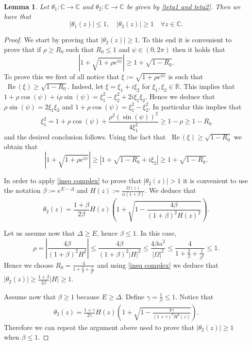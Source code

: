 \documentclass{article}
\numberwithin{equation}{section}
\renewcommand*{\Re}{\mathop{}\!\mathrm{Re}\,} %
\theoremstyle{plain}
\newtheorem{lemma}[theorem]{Lemma}
\begin{document}
\begin{lemma} \label{lem: theta_1 small teta_2 large}
    Let $\theta_1: \mathbb C \rightarrow \mathbb C $ and $\theta_2 : \mathbb C \rightarrow \mathbb C $ be given by \eqref{teta1 and teta2}. 
    Then we have that 
    \[
    |\theta_1(z) | \leq 1 , \quad |\theta_2 (z) | \geq 1 \quad \forall z \in \mathbb C. 
    \]
\end{lemma}
\begin{proof}
    We start by proving that $|\theta_2(z) |\geq 1$. 
    To this end it is convenient to prove that if $\rho \geq R_0$ such that $R_0 \leq 1$ and $\psi \in (0, 2 \pi)$ then it holds that
    \begin{equation} \label{ineq complex}
  |  1+ \sqrt{1+\rho e^{i \psi }} | \geq 1+ \sqrt{1- R_0}. 
    \end{equation}
    To prove this we first of all notice that $\xi:= \sqrt{1+\rho e^{i \psi }}$ is such that $\Re(\xi) \geq \sqrt{1- R_0}$. Indeed, let $\xi=\xi_1+ i \xi_2 $ for $\xi_1, \xi_2 \in \mathbb R$. This implies that $1+ \rho \cos (\psi) + i \rho \sin(\psi) =  \xi_1^2- \xi_2^2 + 2 i \xi_1 \xi_2 $. Hence we deduce that $ \rho\sin (\psi) =  2 \xi_1 \xi_2 $ and $1+ \rho \cos (\psi) = \xi_1^2- \xi_2^2$. In particular this implies that
    \[
    \xi^2_1= 1+\rho \cos(\psi) + \frac{\rho^2 (\sin(\psi))^2 }{4 \xi_1^2} \geq 1-\rho \geq 1-R_0
    \]
    and the desired conclusion follows. 
    Using the fact that $\Re(\xi) \geq \sqrt{1- R_0} $ we obtain that
    \[
     |  1+ \sqrt{1+\rho e^{i \psi }} | \geq   |  1+ \sqrt{1-R_0}+ i \xi_2 | \geq    1+ \sqrt{1-R_0} .
    \]
  
    In order to apply \eqref{ineq complex} to prove that $|\theta_2 (z)|>1$ it is convenient to use the notation $\beta:= e^{E- \Delta }$ and $H(z):= \frac{\Omega(z)}{\alpha (1+\beta)} $. We deduce that
    \[
    \theta_2(z)= \frac{1+\beta}{2 \beta} H(z)  \left( 1+ \sqrt{1- \frac{4 \beta}{(1+\beta )^2 H(z)^2}} \right).
    \]
    
    Let us assume now that $\Delta \geq E$, hence $\beta \leq 1 $. 
  In this case,
  \[ 
  \rho = \left|\frac{4 \beta}{(1+\beta )^2 H^2}\right| \leq  \frac{4 \beta}{(1+\beta )^2 \left|H\right|^2} \leq  \frac{4 \beta \alpha^2 }{ \left|\Omega\right|^2} \leq \frac{4 }{1+\frac{2}{\beta} +\frac{1}{\beta^2}} \leq 1.  
  \] 
  Hence we choose $R_0=  \frac{4 }{1+\frac{2}{\beta} +\frac{1}{\beta^2}}$ and using \eqref{ineq complex} we deduce that $|\theta_2 (z)| \geq \frac{1+ \beta }{ 2 \beta } |H| \geq  1 $. 

  Assume now that $\beta \geq 1 $ because $E \geq \Delta$. Define $\gamma = \frac{1}{\beta } \leq 1 $. Notice that 
    \begin{align*}  \theta_2(z)= \frac{1+\gamma}{2 \gamma} H(z) \left( 1+ \sqrt{1- \frac{4 \gamma}{(1+\gamma)^2 H^2(z)}} \right). 
  \end{align*}
  Therefore we can repeat the argument above used to prove that $|\theta_2(z)| \geq 1$ when $\beta \leq 1 $. 


\end{proof}
\end{document}
